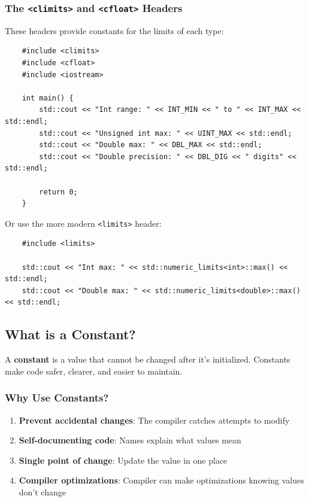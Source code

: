 \subsubsection{The \texttt{<climits>} and \texttt{<cfloat>} Headers}

These headers provide constants for the limits of each type:

\begin{lstlisting}
	#include <climits>
	#include <cfloat>
	#include <iostream>
	
	int main() {
		std::cout << "Int range: " << INT_MIN << " to " << INT_MAX << std::endl;
		std::cout << "Unsigned int max: " << UINT_MAX << std::endl;
		std::cout << "Double max: " << DBL_MAX << std::endl;
		std::cout << "Double precision: " << DBL_DIG << " digits" << std::endl;
		
		return 0;
	}
\end{lstlisting}

Or use the more modern \texttt{<limits>} header:

\begin{lstlisting}
	#include <limits>
	
	std::cout << "Int max: " << std::numeric_limits<int>::max() << std::endl;
	std::cout << "Double max: " << std::numeric_limits<double>::max() << std::endl;
\end{lstlisting}

\subsection{What is a Constant?}

A \textbf{constant} is a value that cannot be changed after it's initialized. Constants make code safer, clearer, and easier to maintain.

\subsubsection{Why Use Constants?}

\begin{enumerate}
	\item \textbf{Prevent accidental changes}: The compiler catches attempts to modify
	\item \textbf{Self-documenting code}: Names explain what values mean
	\item \textbf{Single point of change}: Update the value in one place
	\item \textbf{Compiler optimizations}: Compiler can make optimizations knowing values don't change
\end{enumerate}

